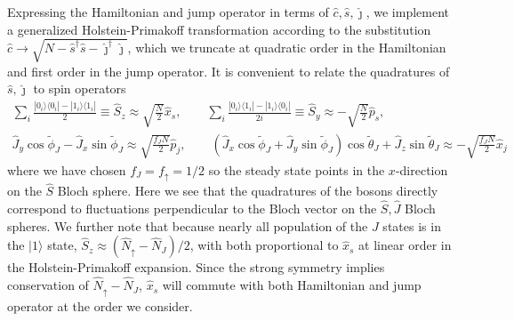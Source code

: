 Expressing the Hamiltonian and jump operator in terms of $\hat c, \hat s, \hat \jmath$, we implement a generalized Holstein-Primakoff transformation according to the substitution $\hat c \to \sqrt{N - \hat{s}^\dagger \hat s - \hat{\jmath}^\dagger \hat \jmath}$, which we truncate at quadratic order in the Hamiltonian and first order in the jump operator. 
It is convenient to relate the quadratures of $\hat s, \hat \jmath$ to spin operators
\begin{subequations}
   \begin{gather}
        \sum_i  \frac{|0_i \rangle \langle 0_i| - |1_i \rangle\langle 1_i|}{2} \equiv
       \hat S_z \approx  \sqrt{\frac{N}{2}} \hat x_s, \qquad
        \sum_i \frac{|0_i \rangle \langle 1_i| - |1_i \rangle \langle 0_i|}{2i} 
       \equiv \hat S_y \approx -\sqrt{\frac{N}{2}} \hat p_s, \\
       \hat J_y \cos \tilde{\phi}_J - \hat J_x \sin \tilde{\phi}_J \approx \sqrt{\frac{f_J N}{2}} \hat p_j, \qquad
       (\hat J_x \cos \tilde{\phi}_J + \hat J_y \sin \tilde{\phi}_J ) \cos \tilde{\theta}_J + \hat J_z \sin \tilde{\theta}_J \approx -\sqrt{\frac{f_J N}{2}} \hat x_j
   \end{gather}
\end{subequations}
where we have chosen $f_J = f_{\uparrow} = 1/2$ so the steady state points in the $x$-direction on the $\hat S$ Bloch sphere. Here we see that the quadratures of the bosons directly correspond to fluctuations perpendicular to the Bloch vector on the $\hat S, \hat J$ Bloch spheres.
We further note that because nearly all population of the $J$ states is in the $|1\rangle$ state, $\hat S_z \approx (\hat N_{\uparrow} - \hat N_J)/2$, with both proportional to $\hat x_s$ at linear order in the Holstein-Primakoff expansion. Since the strong symmetry implies conservation of $\hat N_{\uparrow} - \hat N_{J}$, $\hat x_s$ will commute with both Hamiltonian and jump operator at the order we consider. 

